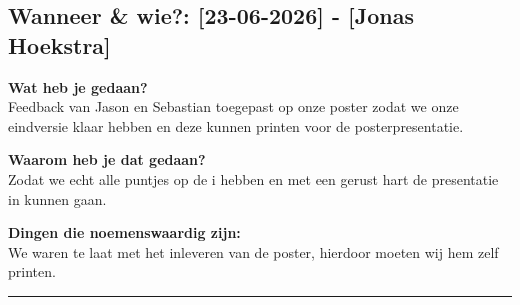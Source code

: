 
\subsection*{Wanneer \& wie?: [23-06-2026] - [Jonas Hoekstra]}

\textbf{Wat heb je gedaan?}\\
Feedback van Jason en Sebastian toegepast op onze poster zodat we onze eindversie klaar hebben en deze kunnen printen voor de posterpresentatie. 
\vspace{0.3cm} 

\noindent \textbf{Waarom heb je dat gedaan?}\\
Zodat we echt alle puntjes op de i hebben en met een gerust hart de presentatie in kunnen gaan.

\noindent \textbf{Dingen die noemenswaardig zijn:}\\
We waren te laat met het inleveren van de poster, hierdoor moeten wij hem zelf printen.


\vspace{0.5cm}
\hrule 
\vspace{0.5cm}
